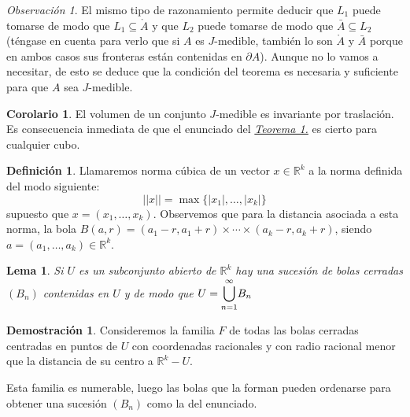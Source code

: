 \documentclass[12pt,twoside]{report}
\theoremstyle{azul}
\theoremstyle{azul2}
\theoremstyle{plain}
\newtheorem*{lem}{Lema}
\theoremstyle{definition}
\newtheorem{defin}{Definición}[chapter]
\newtheorem*{dem}{Demostración}
\newtheorem*{cor}{Corolario}
\theoremstyle{remark}
\newtheorem*{obs}{Observación}
\begin{document}
\begin{obs}
El mismo tipo de razonamiento permite deducir que $L_1$ puede tomarse de modo que $L_1 \subseteq \mathring{A}$ y que $L_2$ puede tomarse de modo que $\bar{A} \subseteq L_2$ (téngase en cuenta para verlo que si $A$ es $J$-medible, también lo son $\mathring{A}$ y $\bar{A}$ porque en ambos casos sus fronteras están contenidas en $\partial A$). Aunque no lo vamos a necesitar, de esto se deduce que la condición del teorema es necesaria y suficiente para que $A$ sea $J$-medible.
\end{obs}
\begin{cor}
El volumen de un conjunto $J$-medible es invariante por traslación. Es consecuencia inmediata de que el enunciado del \hyperref[teo1]{\textit{Teorema 1.}} es cierto para cualquier cubo.
\end{cor}
\begin{defin}

Llamaremos norma cúbica de un vector $x \in \mathbb{R}^k$ a la norma definida del modo siguiente: 
$$||x||=\max\{|x_1|, \ldots, |x_k|\}$$
supuesto que $x=(x_1, \ldots, x_k)$. Observemos que para la distancia asociada a esta norma, la bola $B(a,r)=(a_1-r,a_1+r) \times \cdots \times (a_k-r,a_k+r)$, siendo $a=(a_1, \ldots, a_k) \in \mathbb{R}^k$. 

\end{defin}

\begin{lem}
Si $U$ es un subconjunto abierto de $\mathbb{R}^k$ hay una sucesión de bolas cerradas $(B_n)$ contenidas en $U$ y de modo que $U=\underset{n=1}{\overset{\infty}{\mathlarger{\bigcup}}} B_n$
\end{lem}
\begin{dem}
Consideremos la familia $F$ de todas las bolas cerradas centradas en puntos de $U$ con coordenadas racionales y con radio racional menor que la distancia de su centro a $\mathbb{R}^k - U$.

Esta familia es numerable, luego las bolas que la forman pueden ordenarse para obtener una sucesión $(B_n)$ como la del enunciado. 
\end{dem}
\end{document}
